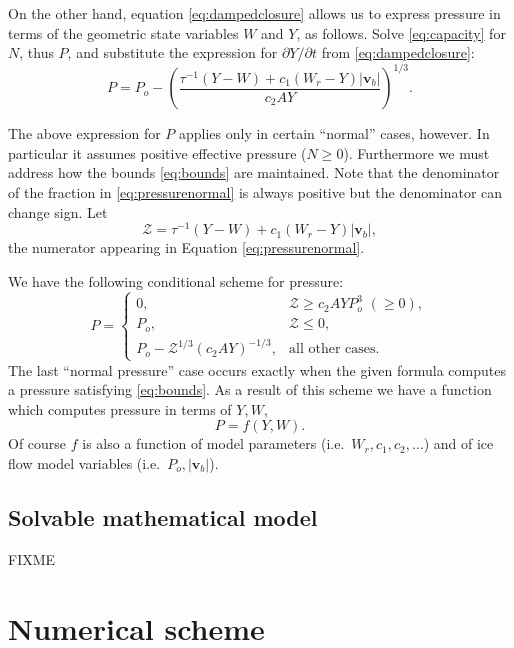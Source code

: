 \documentclass[12pt,final]{amsart}%
\newcommand\bv{\mathbf{v}}
\begin{document}
On the other hand, equation \eqref{eq:dampedclosure} allows us to express pressure in terms of the geometric state variables $W$ and $Y$, as follows.  Solve \eqref{eq:capacity} for $N$, thus $P$, and substitute the expression for $\partial Y/\partial t$ from \eqref{eq:dampedclosure}:
\begin{equation}
P = P_o - \left(\frac{\tau^{-1} (Y-W) + c_1 \left(W_r - Y\right) |\bv_b|}{c_2 A Y}\right)^{1/3}.  \label{eq:pressurenormal}
\end{equation}

The above expression for $P$ applies only in certain ``normal'' cases, however.  In particular it assumes positive effective pressure ($N\ge 0$).  Furthermore we must address how the bounds \eqref{eq:bounds} are maintained.  Note that the denominator of the fraction in \eqref{eq:pressurenormal} is always positive but the denominator can change sign.  Let
	$$\mathcal{Z} = \tau^{-1} (Y-W) + c_1 \left(W_r - Y\right) |\bv_b|,$$
the numerator appearing in Equation \eqref{eq:pressurenormal}.

We have the following conditional scheme for pressure:
\begin{equation}
P = \begin{cases}
0, & \mathcal{Z} \ge c_2 A Y P_o^3\,\, (\ge 0) , \\
P_o, & \mathcal{Z} \le 0, \\
P_o - \mathcal{Z}^{1/3} (c_2 A Y)^{-1/3}, & \text{all other cases}.
\end{cases} \label{eq:pressureWY}
\end{equation}
The last ``normal pressure'' case occurs exactly when the given formula computes a pressure satisfying \eqref{eq:bounds}.  As a result of this scheme we have a function which computes pressure in terms of $Y,W$,
\begin{equation}
P = f(Y,W).
\end{equation}
Of course $f$ is also a function of model parameters (i.e.~$W_r,c_1,c_2,\dots$) and of ice flow model variables (i.e.~$P_o,|\bv_b|$).

\subsection*{Solvable mathematical model}  FIXME



\section{Numerical scheme}
\end{document}
